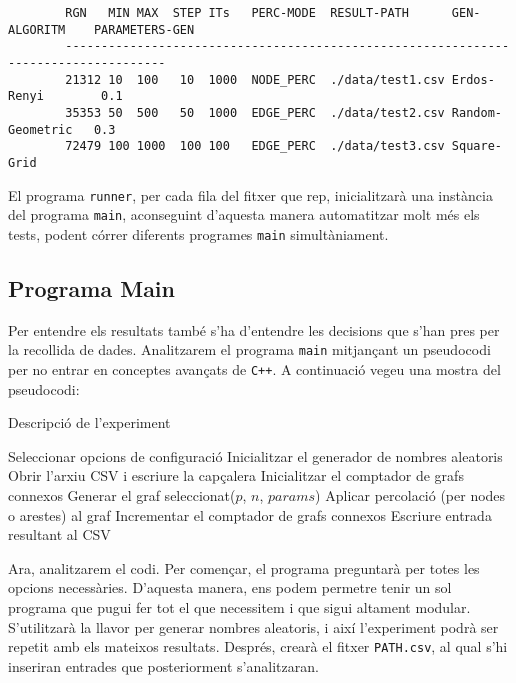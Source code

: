 \documentclass[a4paper]{article}
\begin{document}
	\begin{verbatim}
		RGN   MIN MAX  STEP ITs   PERC-MODE  RESULT-PATH      GEN-ALGORITM    PARAMETERS-GEN
		------------------------------------------------------------------------------------
		21312 10  100   10  1000  NODE_PERC  ./data/test1.csv Erdos-Renyi        0.1
		35353 50  500   50  1000  EDGE_PERC  ./data/test2.csv Random-Geometric   0.3
		72479 100 1000  100 100   EDGE_PERC  ./data/test3.csv Square-Grid
	\end{verbatim}
	
	El programa \texttt{runner}, per cada fila del fitxer que rep, inicialitzarà una instància del programa \texttt{main}, aconseguint d'aquesta manera automatitzar molt més els tests, podent córrer diferents programes \texttt{main} simultàniament. \\
	
	\subsection{Programa Main}
	
	Per entendre els resultats també s'ha d'entendre les decisions que s'han pres per la recollida de dades. Analitzarem el programa \texttt{main} mitjançant un pseudocodi per no entrar en conceptes avançats de \texttt{C++}. A continuació vegeu una mostra del pseudocodi: \\
	
	\begin{algorithm} [H]
		\caption{Descripció de l'experiment}
		\begin{algorithmic}[1]
			\State Seleccionar opcions de configuració
			\State Inicialitzar el generador de nombres aleatoris
			\State Obrir l'arxiu CSV i escriure la capçalera
			\State Inicialitzar el comptador de grafs connexos
			\Repeat
			\State Generar el graf seleccionat($p$, $n$, $params$)
			\State Aplicar percolació (per nodes o arestes) al graf
			\State Incrementar el comptador de grafs connexos
			\EndIf
			\EndFor
			\State Escriure entrada resultant al CSV
			\EndFor
			\EndFor
		\end{algorithmic}
	\end{algorithm}
	
	Ara, analitzarem el codi. Per començar, el programa preguntarà per totes les opcions necessàries. D'aquesta manera, ens podem permetre tenir un sol programa que pugui fer tot el que necessitem i que sigui altament modular. S'utilitzarà la llavor per generar nombres aleatoris, i així l'experiment podrà ser repetit amb els mateixos resultats. Després, crearà el fitxer \texttt{PATH.csv}, al qual s'hi inseriran entrades que posteriorment s'analitzaran. \\
	
\end{document}
